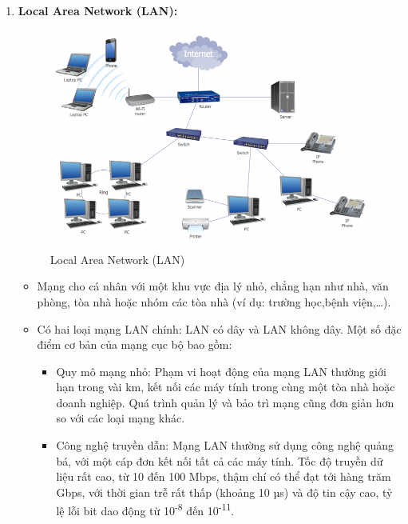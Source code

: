 \documentclass[13pt]{article}
\begin{document}
\begin{enumerate}
    \item \textbf{Local Area Network (LAN):}
    \begin{figure}[h!]
        \centering
        \includegraphics[width=0.7\linewidth]{image/image1.png}
            \caption{Local Area Network (LAN)}
            \label{fig:label1}
    \end{figure}
    \begin{itemize}
        \item Mạng cho cá nhân với một khu vực địa lý nhỏ, chẳng hạn như nhà, văn phòng, tòa nhà hoặc nhóm các tòa nhà (ví dụ: trường học,bệnh viện,…). 
        \item Có hai loại mạng LAN chính: LAN có dây và LAN không dây. Một số đặc điểm cơ bản của mạng cục bộ bao gồm:
        \begin{itemize}
            \item Quy mô mạng nhỏ: Phạm vi hoạt động của mạng LAN thường giới hạn trong vài km, kết nối các máy tính trong cùng một tòa nhà hoặc doanh nghiệp. Quá trình quản lý và bảo trì mạng cũng đơn giản hơn so với các loại mạng khác.
            \item Công nghệ truyền dẫn: Mạng LAN thường sử dụng công nghệ quảng bá, với một cáp đơn kết nối tất cả các máy tính. Tốc độ truyền dữ liệu rất cao, từ 10 đến 100 Mbps, thậm chí có thể đạt tới hàng trăm Gbps, với thời gian trễ rất thấp (khoảng 10 µs) và độ tin cậy cao, tỷ lệ lỗi bit dao động từ 10\textsuperscript{-8} đến 10\textsuperscript{-11}.
        \end{itemize}
    \end{itemize}


\end{enumerate}
\end{document}
